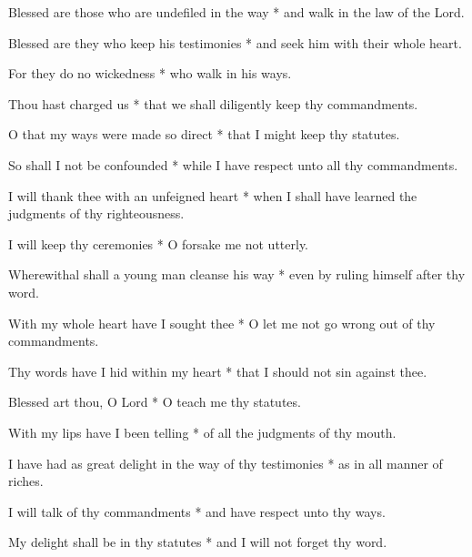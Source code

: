 Blessed are those who are undefiled in the way * and walk in the law of the Lord.

Blessed are they who keep his testimonies * and seek him with their whole heart.

For they do no wickedness * who walk in his ways.

Thou hast charged us * that we shall diligently keep thy commandments.

O that my ways were made so direct * that I might keep thy statutes.

So shall I not be confounded * while I have respect unto all thy commandments.

I will thank thee with an unfeigned heart * when I shall have learned the judgments of thy righteousness.

I will keep thy ceremonies * O forsake me not utterly.

Wherewithal shall a young man cleanse his way * even by ruling himself after thy word.

With my whole heart have I sought thee * O let me not go wrong out of thy commandments.

Thy words have I hid within my heart * that I should not sin against thee.

Blessed art thou, O Lord * O teach me thy statutes.

With my lips have I been telling * of all the judgments of thy mouth.

I have had as great delight in the way of thy testimonies * as in all manner of riches.

I will talk of thy commandments * and have respect unto thy ways.

My delight shall be in thy statutes * and I will not forget thy word.